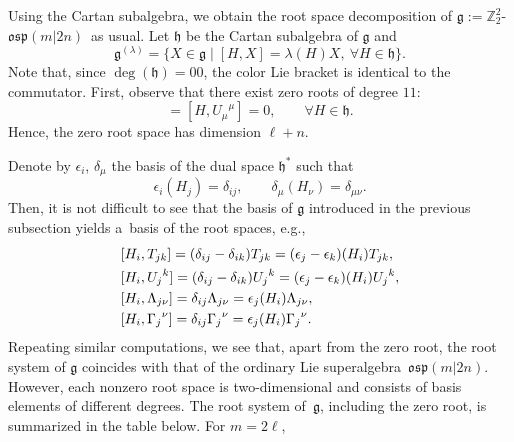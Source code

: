 \documentclass[pdftex]{sigma}
\numberwithin{equation}{section}
\theoremstyle{definition}
\def\nn{\notag}
\def\Z2{\mathbb{Z}_2^2}
\def\g{\mathfrak{g}}
\def\osp{\mathfrak{osp}}
\def\Zosp{$\Z2$-$\osp(m|2n)$}
\begin{document}
Using the Cartan subalgebra, we obtain the root space decomposition of $\g := $\Zosp\ as usual. Let $ \mathfrak{h} $ be the Cartan subalgebra of $\g$ and
\begin{equation*}
	\g^{(\lambda)} = \{ X \in \g \mid [H, X] = \lambda(H) X, \ \forall H \in \mathfrak{h} \}.
\end{equation*}
Note that, since $\deg(\mathfrak{h}) = 00$, the color Lie bracket is identical to the commutator.
First, observe that there exist zero roots of degree $11$:{\samepage
\begin{equation*}
	[H, {U_i}^i] = [H, {U_{\mu}}^{\mu}] = 0, \qquad \forall H \in \mathfrak{h}.
\end{equation*}
Hence, the zero root space has dimension $\ell+n$.}

Denote by $ \epsilon_i$, $\delta_{\mu}$ the basis of the dual space $\mathfrak{h}^*$ such that
\begin{equation*}
	\epsilon_i(H_j) = \delta_{ij}, \qquad
	\delta_{\mu}(H_{\nu}) = \delta_{\mu\nu}.
\end{equation*}
Then, it is not difficult to see that the basis of $\g$ introduced in the previous subsection yields a~basis of the root spaces, e.g.,
\begin{align*}
	&[H_i, T_{jk}]= (\delta_{ij} - \delta_{ik} ) T_{jk} = (\epsilon_j - \epsilon_k)(H_i) T_{jk},
	\nn \\
	&[H_i, {U_j}^k]=(\delta_{ij} - \delta_{ik} ) {U_j}^k = (\epsilon_j - \epsilon_k)(H_i) {U_j}^k,
	\nn \\
	&[H_i, \Lambda_{j\nu}]= \delta_{ij} \Lambda_{j\nu} = \epsilon_j(H_i) \Lambda_{j\nu},
	\nn \\
	&[H_i, {\Gamma_j}^{\nu}]= \delta_{ij}{\Gamma_j}^{\nu} = \epsilon_j(H_i) {\Gamma_j}^{\nu}.
\end{align*}
Repeating similar computations, we see that, apart from the zero root, the root system of $\g$ coincides with that of the ordinary Lie superalgebra~$\osp(m|2n)$.
However, each nonzero root space is two-dimensional and consists of basis elements of different degrees.
The root system of~$\g$, including the zero root, is summarized in the table below. For $m = 2\ell$,
\end{document}
